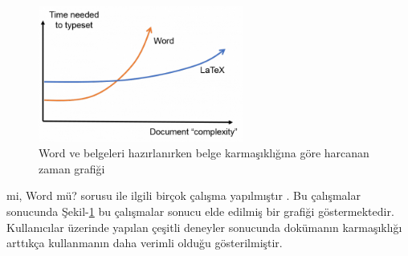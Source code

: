\begin{figure}[!ht]
  \centering
  \includegraphics[width=0.6\textwidth]{zkilavuz/wordvslatex}
  \caption{Word ve \latex belgeleri hazırlanırken belge karmaşıklığına göre harcanan zaman grafiği}
  \label{fig:wordvslatex}
\end{figure}

\latex mi, Word mü? sorusu ile ilgili birçok çalışma yapılmıştır \cite{knauff2014efficiency, brischoux2009don}. Bu çalışmalar sonucunda Şekil-\ref{fig:wordvslatex} bu çalışmalar sonucu elde edilmiş bir grafiği göstermektedir. Kullanıcılar üzerinde yapılan çeşitli deneyler sonucunda dokümanın karmaşıklığı arttıkça \latex kullanmanın daha verimli olduğu gösterilmiştir.

